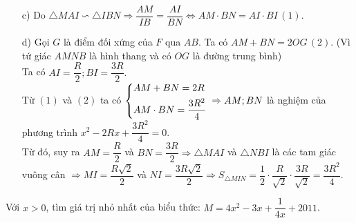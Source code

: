 \begin{ex}
{{\begin{tikzpicture}[scale=.8]
	\end{tikzpicture}
}
\begin{enumerate}
	\item [c)] Do $\triangle MAI \backsim \triangle IBN \Rightarrow \dfrac{AM}{IB}= \dfrac{AI}{BN} \Leftrightarrow AM \cdot BN =AI \cdot BI \, (1).$
	\item [d)]  Gọi $G$ là điểm đối xứng của $F$ qua $AB$. Ta có $AM+BN=2OG \, (2).$ (Vì tứ giác $AMNB$ là hình thang và có $OG$ là đường trung bình)\\
	Ta có $AI = \dfrac{R}{2}; BI = \dfrac{3R}{2}.$\\
	Từ $(1)$ và $(2)$ ta có $\heva{&AM+BN =2R\\&AM\cdot BN =\dfrac{3R^2}{4}}\\  \Rightarrow AM; BN$ là nghiệm của phương trình $x^2-2Rx+\dfrac{3R^2}{4}=0.$\\
	Từ đó, suy ra $AM=\dfrac{R}{2}$ và $BN =\dfrac{3R}{2} \Rightarrow \triangle MAI$ và $\triangle NBI$ là các tam giác vuông cân $\Rightarrow MI =\dfrac{R\sqrt{2}}{2}$ và $NI= \dfrac{3R\sqrt{2}}{2} \Rightarrow S_{\triangle MIN} =\dfrac{1}{2}\cdot \dfrac{R}{\sqrt{2}} \cdot \dfrac{3R}{\sqrt{2}} =\dfrac{3R^2}{4}.$
\end{enumerate}
}
\end{ex}  
\begin{ex}[0,5 điểm]
Với $x > 0$, tìm giá trị nhỏ nhất của biểu thức: $M =4x^2-3x+\dfrac{1}{4x}+2011$.
\end{ex} 
